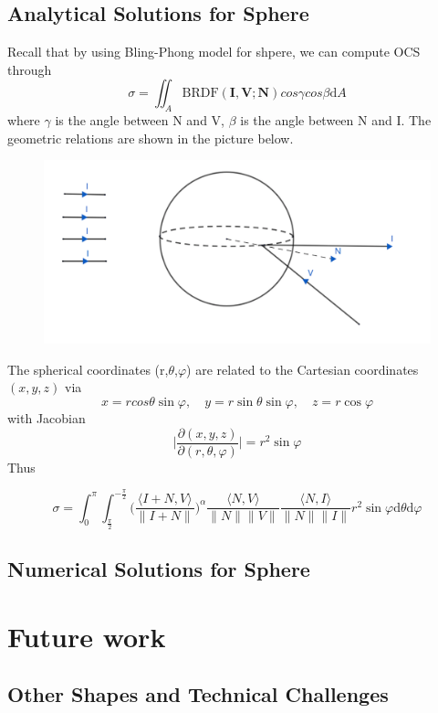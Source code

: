 \documentclass[11pt]{amsart}
\newcommand{\BRDF}{\mathrm{BRDF}}
\newcommand{\ip}[2]{\langle {#1}, {#2} \rangle}
\theoremstyle{definition}
\begin{document}
\subsection{Analytical Solutions for Sphere}
Recall that by using Bling-Phong model for shpere, we can compute OCS through
$$\sigma =\iint_{A}\BRDF(\mathbf{I},\mathbf{V};\mathbf{N}) cos\gamma cos\beta \mathrm{d}A$$
where $\gamma$ is the angle between N and V,  $\beta$ is the angle between N and I. The geometric relations are shown in the picture below.
\begin{figure}[h!]
  \includegraphics[width=4.5in]{./figs/sphere.pdf}
  \label{fig:sphere}
\end{figure}

The spherical coordinates (r,$\theta$,$\varphi$) are related to the Cartesian coordinates $(x,y,z)$ via
$$x =rcos\theta \sin\varphi, \quad y=r\sin\theta \sin\varphi, \quad z=r\cos\varphi $$
with Jacobian 
$$\big|\frac{\partial(x,y,z)}{\partial(r,\theta,\varphi)}\big|= r^2 \sin\varphi $$
Thus

  $$\sigma =\int_{0}^{\pi}\int_{\frac{\pi}{2}}^{-\frac{\pi}{2}}\Bigg(\frac{\ip{I+N}{V}}{\|I+N\|}\Bigg)^\alpha\frac{\ip{N}{V}}{\|N\| \|V\|}\frac{\ip{N}{I}}{\|N\| \|I\|}r^2\sin\varphi\mathrm{d}\theta\mathrm{d}\varphi$$
\subsection{Numerical Solutions for Sphere}
\section{Future work}
\subsection{Other Shapes and Technical Challenges}
\end{document}
